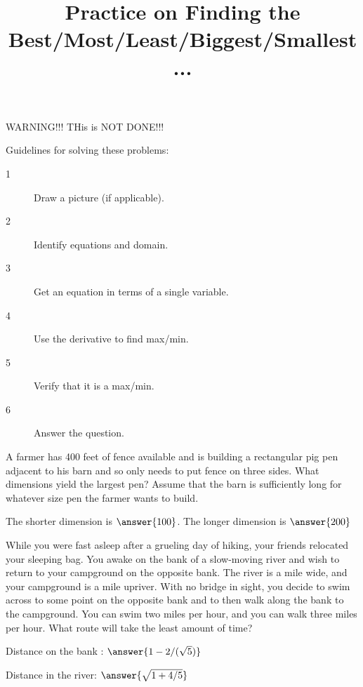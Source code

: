 \documentclass[handout]{ximera}
\title[Exercises:]{Practice on Finding the Best/Most/Least/Biggest/Smallest...}
\begin{document}
\begin{abstract}

\end{abstract}
\maketitle

WARNING!!! THis is NOT DONE!!!

  Guidelines for solving these problems:
\begin{description}
\item[1] Draw a picture (if applicable).
\item[2] Identify equations and domain.
\item[3] Get an equation in terms of a single variable.
\item[4] Use the derivative to find max/min.
\item[5] Verify that it is a max/min.
\item[6] Answer the question.
\end{description}


\begin{exercise}
A farmer has 400 feet of fence available and is building a rectangular pig pen adjacent to his barn and so only needs to put fence on three sides. What dimensions yield the largest pen? Assume that the barn is sufficiently long for whatever size pen the farmer wants to build.

The shorter dimension is $\answer{100}$.  The longer dimension is $\answer{200}$
\end{exercise}


\begin{exercise}
While you were fast asleep after a grueling day of hiking, your friends relocated your sleeping bag. You awake on the bank of a slow-moving river and wish to return to your campground on the opposite bank. The river is a mile wide, and your campground is a mile upriver. With no bridge in sight, you decide to swim across to some point on the opposite bank and to then walk along the bank to the campground. You can swim two miles per hour, and you can walk three miles per hour. What route will take the least amount of time?

Distance on the bank : $\answer{1-2/(\sqrt{5})}$ 

Distance in the river: $\answer{\sqrt{1+4/5}}$

\end{exercise}
\end{document}
